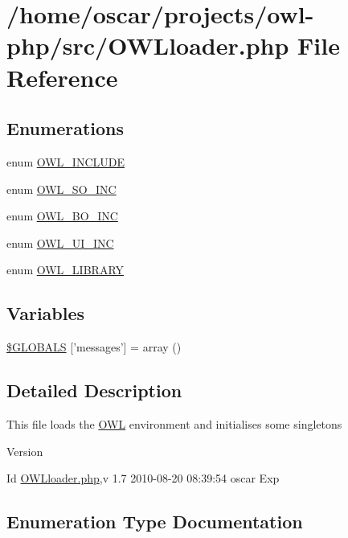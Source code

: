 \section{/home/oscar/projects/owl-\/php/src/OWLloader.php File Reference}
\label{OWLloader_8php}
\subsection*{Enumerations}
\begin{DoxyCompactItemize}
\item 
enum \hyperlink{OWLloader_8php_a4d33a8f2fcc9c83cbeea921c4cb23a7f}{OWL\_\-INCLUDE} 
\item 
enum \hyperlink{OWLloader_8php_a75dffdef5ba58a0ba5f21ed40627897f}{OWL\_\-SO\_\-INC} 
\item 
enum \hyperlink{OWLloader_8php_aca50646bc73c3addf0e0f25081eae0ae}{OWL\_\-BO\_\-INC} 
\item 
enum \hyperlink{OWLloader_8php_a2e11101c70f011a91d0d9c7f8e217738}{OWL\_\-UI\_\-INC} 
\item 
enum \hyperlink{OWLloader_8php_a74eed08508c8b70677c4167acf49e427}{OWL\_\-LIBRARY} 
\end{DoxyCompactItemize}
\subsection*{Variables}
\begin{DoxyCompactItemize}
\item 
\hyperlink{OWLloader_8php_a65f2996116eed36e9ab25f254a470259}{\$GLOBALS} \mbox{[}'messages'\mbox{]} = array ()
\end{DoxyCompactItemize}


\subsection{Detailed Description}
This file loads the \hyperlink{classOWL}{OWL} environment and initialises some singletons \begin{DoxyVersion}{Version}

\end{DoxyVersion}
\begin{DoxyParagraph}{Id}
\hyperlink{OWLloader_8php}{OWLloader.php},v 1.7 2010-\/08-\/20 08:39:54 oscar Exp 
\end{DoxyParagraph}


\subsection{Enumeration Type Documentation}
